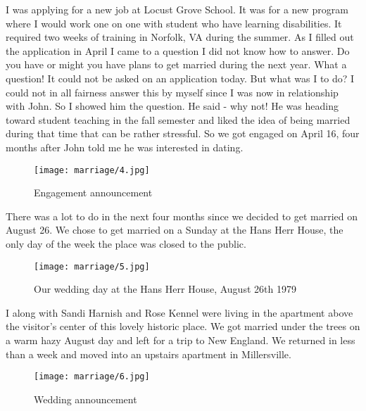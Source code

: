 I was applying for a new job at Locust Grove School.
It was for a new program where I would work one on one with student who have learning disabilities.
It required two weeks of training in Norfolk, VA during the summer.
As I filled out the application in April I came to a question I did not know how to answer.
Do you have or might you have plans to get married during the next year.
What a question! It could not be asked on an application today.
But what was I to do? I could not in all fairness answer this by myself since I was now in relationship with John.
So I showed him the question.
He said - why not! He was heading toward student teaching in the fall semester and liked the idea of being married during that time that can be rather stressful.
So we got engaged on April 16, four months after John told me he was interested in dating.

\begin{figure}
\centering
\texttt{[image: marriage/4.jpg]}
\caption{
Engagement announcement
}
\end{figure}
There was a lot to do in the next four months since we decided to get married on August 26.
We chose to get married on a Sunday at the Hans Herr House, the only day of the week the place was closed to the public.
\begin{figure}
\centering
\texttt{[image: marriage/5.jpg]}
\caption{
Our wedding day at the Hans Herr House, August 26th 1979
}
\end{figure}
I along with Sandi Harnish and Rose Kennel were living in the apartment above the visitor's center of this lovely historic place.
We got married under the trees on a warm hazy August day and left for a trip to New England.
We returned in less than a week and moved into an upstairs apartment in Millersville.
\begin{figure}
\centering
\texttt{[image: marriage/6.jpg]}
\caption{
Wedding announcement
}
\end{figure}
